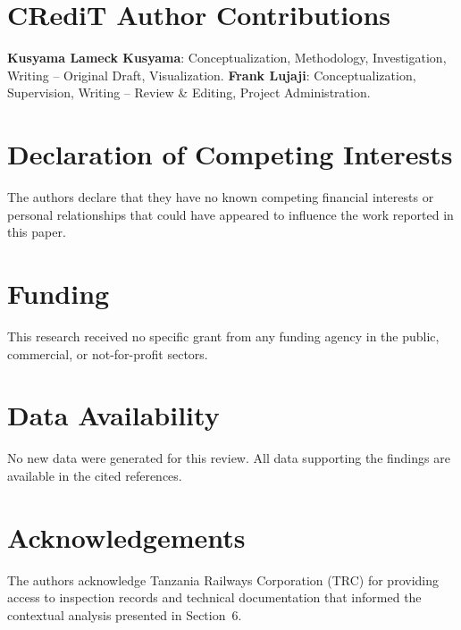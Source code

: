 \documentclass[preprint,12pt,3p]{elsarticle}
\begin{document}
\section*{CRediT Author Contributions}

\textbf{Kusyama Lameck Kusyama}: Conceptualization, Methodology,
Investigation, Writing -- Original Draft, Visualization.
\textbf{Frank Lujaji}: Conceptualization, Supervision, Writing --
Review \& Editing, Project Administration.


\section*{Declaration of Competing Interests}

The authors declare that they have no known competing financial interests
or personal relationships that could have appeared to influence the work
reported in this paper.


\section*{Funding}

This research received no specific grant from any funding agency in the
public, commercial, or not-for-profit sectors.


\section*{Data Availability}

No new data were generated for this review. All data supporting the
findings are available in the cited references.


\section*{Acknowledgements}

The authors acknowledge Tanzania Railways Corporation (TRC) for
providing access to inspection records and technical documentation
that informed the contextual analysis presented in Section~6.




\end{document}
